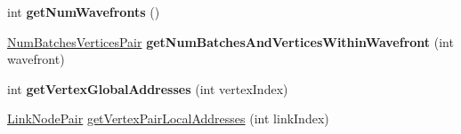 \begin{DoxyCompactItemize}
int {\bfseries get\+Num\+Wavefronts} ()
\item 
\mbox{\label{classbtSoftBodyLinkDataOpenCLSIMDAware_a9fe26bb2f2461f8a34157eac83d30e0c}} 
\hyperlink{structbtSoftBodyLinkDataOpenCLSIMDAware_1_1NumBatchesVerticesPair}{Num\+Batches\+Vertices\+Pair} {\bfseries get\+Num\+Batches\+And\+Vertices\+Within\+Wavefront} (int wavefront)
\item 
\mbox{\label{classbtSoftBodyLinkDataOpenCLSIMDAware_a755a465a5e26910287ddbed34ae96a5c}} 
int {\bfseries get\+Vertex\+Global\+Addresses} (int vertex\+Index)
\item 
\hyperlink{classbtSoftBodyLinkData_1_1LinkNodePair}{Link\+Node\+Pair} \hyperlink{classbtSoftBodyLinkDataOpenCLSIMDAware_a02bb3654ae8ced9acdae914a23e0ae2b}{get\+Vertex\+Pair\+Local\+Addresses} (int link\+Index)
\end{DoxyCompactItemize}
